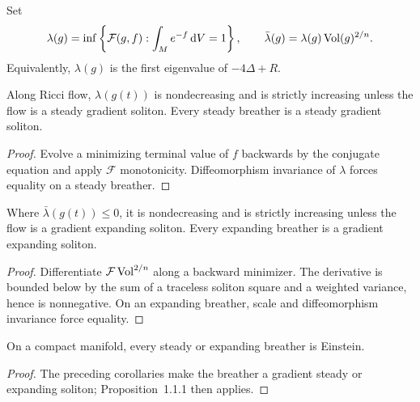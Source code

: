 Set
\[
\lambda(g)=\inf\left\{\mathcal F(g,f):\int_Me^{-f}\,\mathrm{d} V=1\right\},
\qquad
\bar\lambda(g)=\lambda(g)\operatorname{Vol}(g)^{2/n}.
\]
Equivalently, $\lambda(g)$ is the first eigenvalue of $-4\Delta+R$.

\begin{corollary}
  \label{cor:cz-lambda-monotonicity-and-steady-breathers}
Along Ricci flow, $\lambda(g(t))$ is nondecreasing and is strictly
increasing unless the flow is a steady gradient soliton.  Every steady
breather is a steady gradient soliton.
\end{corollary}
\begin{proof}
\sketch Evolve a minimizing terminal value of $f$ backwards by the
conjugate equation and apply $\mathcal F$ monotonicity.  Diffeomorphism
invariance of $\lambda$ forces equality on a steady breather.
\end{proof}

\begin{corollary}
  \label{cor:cz-scale-invariant-lambda-monotonicity-and-expanding-breathers}
Where $\bar\lambda(g(t))\le0$, it is nondecreasing and is strictly
increasing unless the flow is a gradient expanding soliton.  Every
expanding breather is a gradient expanding soliton.
\end{corollary}
\begin{proof}
\sketch Differentiate $\mathcal F\operatorname{Vol}^{2/n}$ along a backward
minimizer.  The derivative is bounded below by the sum of a traceless
soliton square and a weighted variance, hence is nonnegative.  On an
expanding breather, scale and diffeomorphism invariance force equality.
\end{proof}

\begin{proposition}
  \label{prop:cz-steady-and-expanding-breathers-are-einstein}
On a compact manifold, every steady or expanding breather is Einstein.
\end{proposition}
\begin{proof}
\sketch The preceding corollaries make the breather a gradient steady
or expanding soliton; Proposition~1.1.1 then applies.
\end{proof}

